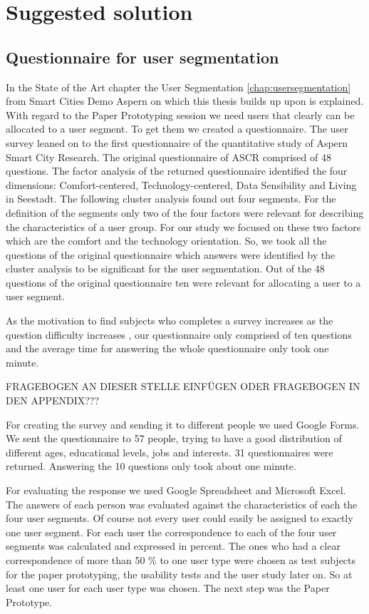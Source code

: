 \chapter{Suggested solution}



\section{Questionnaire for user segmentation}

In the State of the Art chapter the User Segmentation \ref{chap:usersegmentation} from Smart Cities Demo Aspern on which this thesis builds up upon is explained. With regard to the Paper Prototyping session we need users that clearly can be allocated to a user segment. To get them we created a questionnaire. The user survey leaned on to the first questionnaire of the quantitative study of Aspern Smart City Research. The original questionnaire of ASCR comprised of 48 questions. The factor analysis of the returned questionnaire identified the four dimensions: Comfort-centered, Technology-centered, Data Sensibility and Living in Seestadt. The following cluster analysis found out four segments. For the definition of the segments only two of the four factors were relevant for describing the characteristics of a user group. For our study we focused on these two factors which are the comfort and the technology orientation. So, we took all the questions of the original questionnaire which answers were identified by the cluster analysis to be significant for the user segmentation. Out of the 48 questions of the original questionnaire ten were relevant for allocating a user to a user segment.

As the motivation to find subjects who completes a survey increases as the question difficulty increases \cite{andrews2007conducting}, our questionnaire only comprised of ten questions and the average time for answering the whole questionnaire only took one minute.

FRAGEBOGEN AN DIESER STELLE EINFÜGEN ODER FRAGEBOGEN IN DEN APPENDIX???


For creating the survey and sending it to different people we used Google Forms. We sent the questionnaire to 57 people, trying to have a good distribution of different ages, educational levels, jobs and interests. 31 questionnaires were returned. Answering the 10 questions only took about one minute.

For evaluating the response we used Google Spreadsheet and Microsoft Excel. The answers of each person was evaluated against the characteristics of each the four user segments. Of course not every user could easily be assigned to exactly one user segment. For each user the correspondence to each of the four user segments was calculated and expressed in percent. The ones who had a clear correspondence of more than 50 \% to one user type were chosen as test subjects for the paper prototyping, the usability tests and the user study later on. So at least one user for each user type was chosen. The next step was the Paper Prototype.






